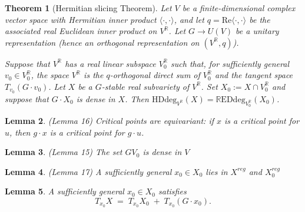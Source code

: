 \documentclass[11pt]{amsart}
\def\R{\mathbb R}\let\er\R
\theoremstyle{plain}
\newtheorem{theorem}{Theorem}
\newtheorem{lemma}[theorem]{Lemma}
\theoremstyle{definition}
\theoremstyle{remark}
\begin{document}
\begin{theorem}[Hermitian slicing Theorem]\label{dbrevised}
Let $V$ be a finite-dimensional complex vector space with Hermitian inner product $\langle\cdot,\cdot\rangle$,
and let $q=\mathrm{Re}\langle\cdot,\cdot\rangle$ be the associated real Euclidean inner product on $V^{\mathbb R}$.
Let $G\to U(V)$ be a unitary representation (hence an orthogonal representation on $(V^{\mathbb R},q)$).

Suppose that $V^{\mathbb{R}}$ has a real linear subspace $V_{0}^{\mathbb{R}}$ such that, for sufficiently
general $v_0 \in V_{0}^{\mathbb{R}}$, the space $V^{\mathbb{R}}$ is the $q$-orthogonal direct sum of
$V_{0}^{\mathbb{R}}$ and the tangent space $T_{v_0}(G \cdot v_0)$.
Let $X$ be a $G$-stable real subvariety of $V^{\mathbb{R}}$.
Set $X_0 := X \cap V_{0}^{\mathbb{R}}$ and suppose that $G \cdot X_0$ is dense in $X$.
Then $\mathrm{HDdeg}_{V^\mathbb{R}}(X)=\mathrm{\mathbb{R}EDdeg}_{V_0^{\R}}(X_0)$.
\end{theorem}







\begin{lemma}\cite{bik2018eddegrees}(Lemma 16)
Critical points are equivariant: if $x$ is a critical point for $u$, then $g\cdot x$ is a critical point for $g\cdot u$.\label{hdcrit}
\end{lemma}

\begin{lemma}\cite{bik2018eddegrees}(Lemma 15)
    The set $GV_0$ is dense in $V$\label{dense}
\end{lemma}
\begin{lemma}\cite{bik2018eddegrees}(Lemma 17)
   A sufficiently general $x_0 \in X_0$  lies in $X^{reg}$ and $X_0^{reg}$
\end{lemma}

\begin{lemma}\label{TSG}
A sufficiently general $x_{0} \in X_{0}$ satisfies
\[
T_{x_{0}}X \;=\; T_{x_{0}}X_{0} \;+\; T_{x_{0}}(G\cdot x_{0}).
\]
\end{lemma}
\end{document}
